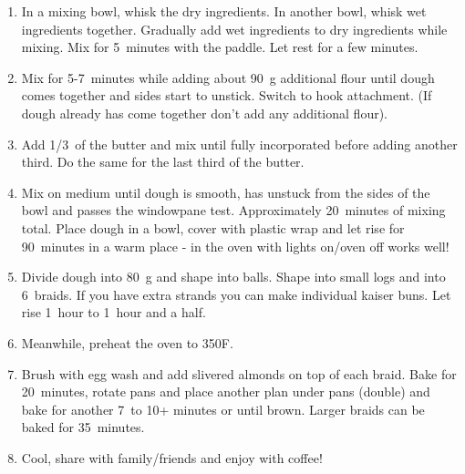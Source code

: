 \begin{enumerate}
    \item In a mixing bowl, whisk the dry ingredients. In another bowl, whisk wet ingredients together. Gradually add wet ingredients to dry ingredients while mixing. Mix for 5~minutes with the paddle. Let rest for a few minutes.
    \item Mix for 5-7~minutes while adding about 90~g additional flour until dough comes together and sides start to unstick. Switch to hook attachment. (If dough already has come together don't add any additional flour).
    \item Add 1/3~of the butter and mix until fully incorporated before adding another third. Do the same for the last third of the butter.
    \item Mix on medium until dough is smooth, has unstuck from the sides of the bowl and passes the windowpane test. Approximately 20~minutes of mixing total. Place dough in a bowl, cover with plastic wrap and let rise for 90~minutes in a warm place - in the oven with lights on/oven off works well!
    \item Divide dough into 80~g and shape into balls. Shape into small logs and into 6~braids. If you have extra strands you can make individual kaiser buns. Let rise 1~hour to 1~hour and a half.
    \item Meanwhile, preheat the oven to 350\degree F.
    \item Brush with egg wash and add slivered almonds on top of each braid. Bake for 20~minutes, rotate pans and place another plan under pans (double) and bake for another 7~to 10+ minutes or until brown. Larger braids can be baked for 35~minutes.
    \item Cool, share with family/friends and enjoy with coffee!
\end{enumerate}


